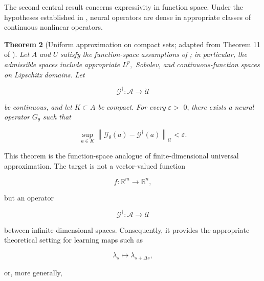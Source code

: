 The second central result concerns expressivity in function space. Under the hypotheses established in \cite{kovachki2023operators}, neural operators are dense in appropriate classes of continuous nonlinear operators.

\textbf{Theorem} \textbf{2} (Uniform approximation on compact sets; adapted from Theorem 11 of \cite{kovachki2023operators}). \emph{Let} \(A\) \emph{and} \(U\) \emph{satisfy} \emph{the} \emph{function-space} \emph{assumptions} \emph{of} \emph{\cite{kovachki2023operators};} \emph{in} \emph{particular,} \emph{the} \emph{admissible} \emph{spaces} \emph{include} \emph{appropriate} \(L^{p} ,\) \emph{Sobolev,} \emph{and} \emph{continuous-function} \emph{spaces} \emph{on} \emph{Lipschitz} \emph{domains.} \emph{Let}

\begin{equation}
\label{eq:234}
\mathcal G^{\dagger}:\mathcal A\to\mathcal U
\end{equation}

\emph{be} \emph{continuous,} \emph{and} \emph{let} \(K \subset A\) \emph{be} \emph{compact.} \emph{For} \emph{every} \(\varepsilon >\) 0, \emph{there} \emph{exists} \emph{a} \emph{neural} \emph{operator} \(G_{\theta}\) \emph{such} \emph{that}

\begin{equation}
\label{eq:235}
\sup_{a\in K}\left\|\mathcal G_{\theta}(a)-\mathcal G^{\dagger}(a)\right\|_{\mathcal U}<\varepsilon.
\end{equation}

This theorem is the function-space analogue of finite-dimensional universal approximation. The target is not a vector-valued function

\begin{equation}
\label{eq:236}
f:\mathbb R^m\to\mathbb R^n,
\end{equation}

but an operator

\begin{equation}
\label{eq:237}
\mathcal G^{\dagger}:\mathcal A\to\mathcal U
\end{equation}

between infinite-dimensional spaces. Consequently, it provides the appropriate theoretical setting for learning maps such as

\begin{equation}
\label{eq:238}
\lambda_s\longmapsto\lambda_{s+\Delta s},
\end{equation}

or, more generally,

